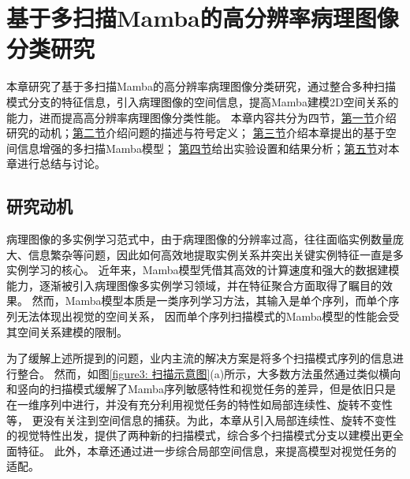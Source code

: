 \chapter[\hspace{0pt}基于多扫描Mamba的高分辨率病理图像分类研究]{{\heiti{}\hspace{0pt}基于多扫描Mamba的高分辨率病理图像分类研究}}\label{chapter3: 基于多扫描Mamba的高分辨率病理图像分类研究}
\removelofgap
\removelotgap
本章研究了基于多扫描Mamba的高分辨率病理图像分类研究，通过整合多种扫描模式分支的特征信息，引入病理图像的空间信息，提高Mamba建模2D空间关系的能力，进而提高高分辨率病理图像分类性能。
本章内容共分为四节，\hyperref[section3: 研究动机]{第一节}介绍研究的动机；\hyperref[section3: 问题描述和符号定义]{第二节}介绍问题的描述与符号定义；
\hyperref[section3: 基于空间信息增强的多扫描Mamba模型]{第三节}介绍本章提出的基于空间信息增强的多扫描Mamba模型；
\hyperref[section3: 实验设置及结果分析]{第四节}给出实验设置和结果分析；\hyperref[section3: 本章小结]{第五节}对本章进行总结与讨论。

\section[\hspace{-2pt}研究动机]{{\heiti{} \hspace{-8pt}研究动机}}\label{section3: 研究动机}


病理图像的多实例学习范式中，由于病理图像的分辨率过高，往往面临实例数量庞大、信息繁杂等问题，因此如何高效地提取实例关系并突出关键实例特征一直是多实例学习的核心。
近年来，Mamba模型凭借其高效的计算速度和强大的数据建模能力，逐渐被引入病理图像多实例学习领域，并在特征聚合方面取得了瞩目的效果。
然而，Mamba模型本质是一类序列学习方法，其输入是单个序列，而单个序列无法体现出视觉的空间关系，
因而单个序列扫描模式的Mamba模型的性能会受其空间关系建模的限制。

为了缓解上述所提到的问题，业内主流的解决方案是将多个扫描模式序列的信息进行整合。
然而，如图\ref{figure3: 扫描示意图}(a)所示，大多数方法虽然通过类似横向和竖向的扫描模式缓解了Mamba序列敏感特性和视觉任务的差异，但是依旧只是在一维序列中进行，并没有充分利用视觉任务的特性如局部连续性、旋转不变性等，
更没有关注到空间信息的捕获。为此，本章从引入局部连续性、旋转不变性的视觉特性出发，提供了两种新的扫描模式，综合多个扫描模式分支以建模出更全面特征。
此外，本章还通过进一步综合局部空间信息，来提高模型对视觉任务的适配。

